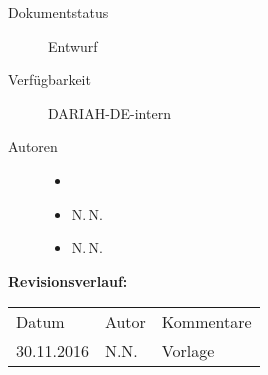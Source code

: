 \begin{description}
    \item[Dokumentstatus] Entwurf%
    \item[Verfügbarkeit] DARIAH-DE-intern
    \item[Autoren]
    \begin{itemize}
        \item[ ] %
        \item[ ] N.\,N.
        \item[ ] N.\,N.
    \end{itemize}
\end{description}

\vspace{15mm}
\noindent\textbf{Revisionsverlauf:}\\
\begin{center}
    \begin{tabular}{l l l}
        Datum & Autor & Kommentare  \\
        30.11.2016 & N.N. & Vorlage 
    \end{tabular}
\end{center}

